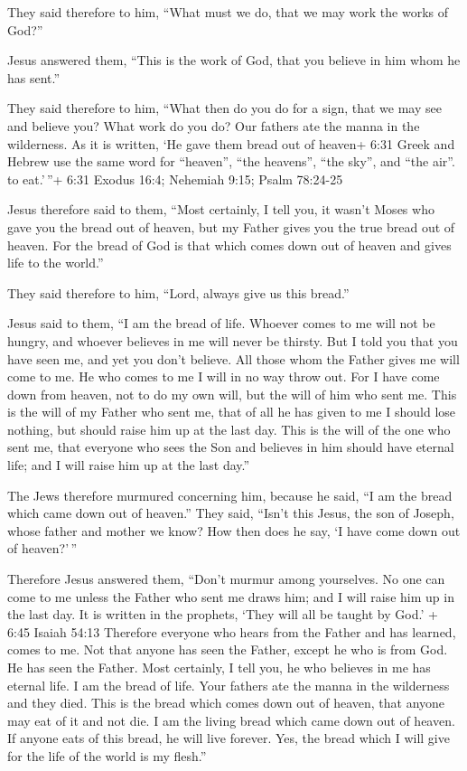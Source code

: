  They said therefore to him, ``What must we do, that we may
work the works of God?''

 Jesus answered them, ``This is the work of God, that you
believe in him whom he has sent.''

 They said therefore to him, ``What then do you do for a
sign, that we may see and believe you? What work do you do?
 Our fathers ate the manna in the wilderness. As it is
written, `He gave them bread out of heaven+ 6:31 Greek and Hebrew use
the same word for ``heaven'', ``the heavens'', ``the sky'', and ``the
air''. to eat.'\,''+ 6:31 Exodus 16:4; Nehemiah 9:15; Psalm 78:24-25

 Jesus therefore said to them, ``Most certainly, I tell
you, it wasn't Moses who gave you the bread out of heaven, but my Father
gives you the true bread out of heaven.  For the bread of
God is that which comes down out of heaven and gives life to the
world.''

 They said therefore to him, ``Lord, always give us this
bread.''

 Jesus said to them, ``I am the bread of life. Whoever
comes to me will not be hungry, and whoever believes in me will never be
thirsty.  But I told you that you have seen me, and yet you
don't believe.  All those whom the Father gives me will
come to me. He who comes to me I will in no way throw out. 
For I have come down from heaven, not to do my own will, but the will of
him who sent me.  This is the will of my Father who sent
me, that of all he has given to me I should lose nothing, but should
raise him up at the last day.  This is the will of the one
who sent me, that everyone who sees the Son and believes in him should
have eternal life; and I will raise him up at the last day.''

 The Jews therefore murmured concerning him, because he
said, ``I am the bread which came down out of heaven.'' 
They said, ``Isn't this Jesus, the son of Joseph, whose father and
mother we know? How then does he say, `I have come down out of
heaven?'\,''

 Therefore Jesus answered them, ``Don't murmur among
yourselves.  No one can come to me unless the Father who
sent me draws him; and I will raise him up in the last day.
 It is written in the prophets, `They will all be taught by
God.' + 6:45 Isaiah 54:13 Therefore everyone who hears from the Father
and has learned, comes to me.  Not that anyone has seen the
Father, except he who is from God. He has seen the Father. 
Most certainly, I tell you, he who believes in me has eternal life.
 I am the bread of life.  Your fathers ate the
manna in the wilderness and they died.  This is the bread
which comes down out of heaven, that anyone may eat of it and not die.
 I am the living bread which came down out of heaven. If
anyone eats of this bread, he will live forever. Yes, the bread which I
will give for the life of the world is my flesh.''

